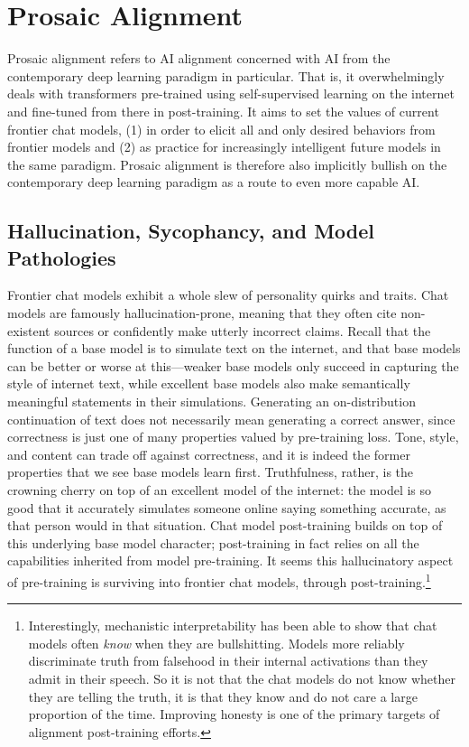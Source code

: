 \section{Prosaic Alignment}
Prosaic alignment refers to AI alignment concerned with AI from the
contemporary deep learning paradigm in particular. That is, it overwhelmingly
deals with transformers pre-trained using self-supervised learning on the
internet and fine-tuned from there in post-training. It aims to set the values
of current frontier chat models, (1) in order to elicit all and only desired
behaviors from frontier models and (2) as practice for increasingly intelligent
future models in the same paradigm. Prosaic alignment is therefore also
implicitly bullish on the contemporary deep learning paradigm as a route to
even more capable AI.

\subsection{Hallucination, Sycophancy, and Model Pathologies}
Frontier chat models exhibit a whole slew of personality quirks and traits.
Chat models are famously hallucination-prone, meaning that they often cite
non-existent sources or confidently make utterly incorrect claims. Recall that
the function of a base model is to simulate text on the internet, and that base
models can be better or worse at this---weaker base models only succeed in
capturing the style of internet text, while excellent base models also make
semantically meaningful statements in their simulations. Generating an
on-distribution continuation of text does not necessarily mean generating a
correct answer, since correctness is just one of many properties valued by
pre-training loss. Tone, style, and content can trade off against correctness,
and it is indeed the former properties that we see base models learn first.
Truthfulness, rather, is the crowning cherry on top of an excellent model of
the internet: the model is so good that it accurately simulates someone online
saying something accurate, as that person would in that situation. Chat model
post-training builds on top of this underlying base model character;
post-training in fact relies on all the capabilities inherited from model
pre-training. It seems this hallucinatory aspect of pre-training is surviving
into frontier chat models, through post-training.\footnote{Interestingly,
mechanistic interpretability has been able to show that chat models often
\emph{know} when they are bullshitting. Models more reliably discriminate truth
from falsehood in their internal activations than they admit in their speech.
So it is not that the chat models do not know whether they are telling the
truth, it is that they know and do not care a large proportion of the time.
Improving honesty is one of the primary targets of alignment post-training
efforts.}

